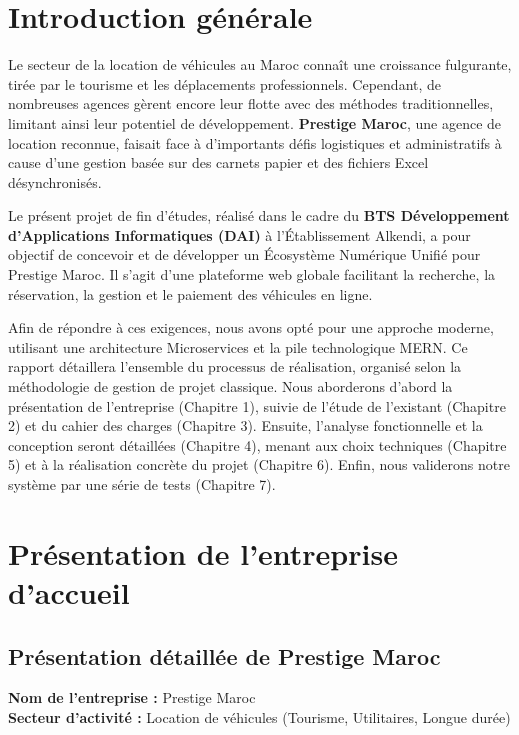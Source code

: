 \documentclass[12pt, a4paper]{report}
\begin{document}
\chapter*{Introduction générale}

Le secteur de la location de véhicules au Maroc connaît une croissance fulgurante, tirée par le tourisme et les déplacements professionnels. Cependant, de nombreuses agences gèrent encore leur flotte avec des méthodes traditionnelles, limitant ainsi leur potentiel de développement. \textbf{Prestige Maroc}, une agence de location reconnue, faisait face à d'importants défis logistiques et administratifs à cause d'une gestion basée sur des carnets papier et des fichiers Excel désynchronisés.

Le présent projet de fin d'études, réalisé dans le cadre du \textbf{BTS Développement d'Applications Informatiques (DAI)} à l'Établissement Alkendi, a pour objectif de concevoir et de développer un Écosystème Numérique Unifié pour Prestige Maroc. Il s'agit d'une plateforme web globale facilitant la recherche, la réservation, la gestion et le paiement des véhicules en ligne.

Afin de répondre à ces exigences, nous avons opté pour une approche moderne, utilisant une architecture Microservices et la pile technologique MERN. Ce rapport détaillera l'ensemble du processus de réalisation, organisé selon la méthodologie de gestion de projet classique. Nous aborderons d'abord la présentation de l'entreprise (Chapitre 1), suivie de l'étude de l'existant (Chapitre 2) et du cahier des charges (Chapitre 3). Ensuite, l'analyse fonctionnelle et la conception seront détaillées (Chapitre 4), menant aux choix techniques (Chapitre 5) et à la réalisation concrète du projet (Chapitre 6). Enfin, nous validerons notre système par une série de tests (Chapitre 7).

\chapter{Présentation de l'entreprise d'accueil}

\section{Présentation détaillée de Prestige Maroc}
\textbf{Nom de l'entreprise :} Prestige Maroc \\
\textbf{Secteur d'activité :} Location de véhicules (Tourisme, Utilitaires, Longue durée) \\
\end{document}
